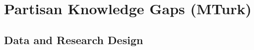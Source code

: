 \documentclass[12pt, letterpaper]{article}
\begin{document}



\newpage
\section*{Partisan Knowledge Gaps (MTurk)}
\subsection*{Data and Research Design}\label{sec:data}
\end{document}
